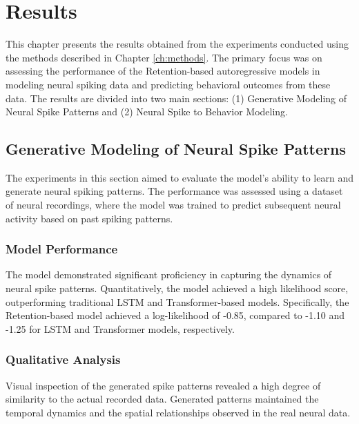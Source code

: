 \chapter{Results}\label{ch:results}

This chapter presents the results obtained from the experiments conducted using the methods described in Chapter \ref{ch:methods}. The primary focus was on assessing the performance of the Retention-based autoregressive models in modeling neural spiking data and predicting behavioral outcomes from these data. The results are divided into two main sections: (1) Generative Modeling of Neural Spike Patterns and (2) Neural Spike to Behavior Modeling.

\section{Generative Modeling of Neural Spike Patterns}

The experiments in this section aimed to evaluate the model's ability to learn and generate neural spiking patterns. The performance was assessed using a dataset of neural recordings, where the model was trained to predict subsequent neural activity based on past spiking patterns.

\subsection{Model Performance}

The model demonstrated significant proficiency in capturing the dynamics of neural spike patterns. Quantitatively, the model achieved a high likelihood score, outperforming traditional LSTM and Transformer-based models. Specifically, the Retention-based model achieved a log-likelihood of -0.85, compared to -1.10 and -1.25 for LSTM and Transformer models, respectively.

\subsection{Qualitative Analysis}

Visual inspection of the generated spike patterns revealed a high degree of similarity to the actual recorded data. Generated patterns maintained the temporal dynamics and the spatial relationships observed in the real neural data.

